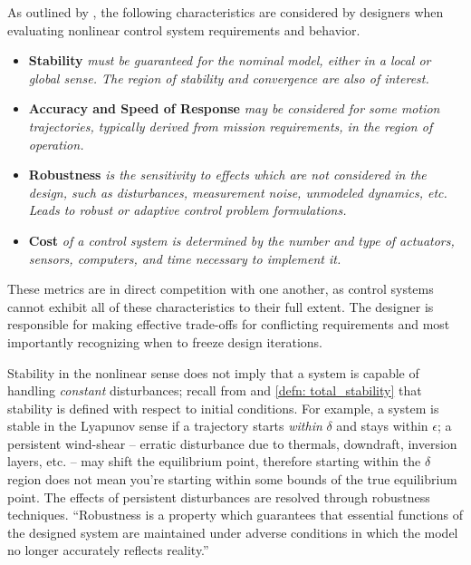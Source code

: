 \documentclass[12pt]{ucthesis}
\begin{document}
As outlined by \citet{Slotine1991}, the following characteristics are considered by designers when evaluating nonlinear control system requirements and behavior.
\begin{itemize}[labelindent=\parindent,leftmargin=\parindent,noitemsep,nosep]
	\item{\textbf{Stability} \textit{must be guaranteed for the nominal model, either in a local or global sense. The region of stability and convergence are also of interest.}
	}
	\item{\textbf{Accuracy and Speed of Response} \textit{may be considered for some motion trajectories, typically derived from mission requirements, in the region of operation.}
	}
	\item{\textbf{Robustness} \textit{is the sensitivity to effects which are not considered in the design, such as disturbances, measurement noise, unmodeled dynamics, etc. Leads to robust or adaptive control problem formulations.}
	}
	\item{\textbf{Cost} \textit{of a control system is determined by the number and type of actuators, sensors, computers, and time necessary to implement it.}
	}
\end{itemize}

These metrics are in direct competition with one another, as control systems cannot exhibit all of these characteristics to their full extent. The designer is responsible for making effective trade-offs for conflicting requirements and most importantly recognizing when to freeze design iterations.

Stability in the nonlinear sense does not imply that a system is capable of handling \textit{constant} disturbances; recall from  and \ref{defn: total_stability} that stability is defined with respect to initial conditions. For example, a system is stable in the Lyapunov sense if a trajectory starts \textit{within} $\delta$ and stays within $\epsilon$; a persistent wind-shear -- erratic disturbance due to thermals, downdraft, inversion layers, etc. -- may shift the equilibrium point, therefore starting within the $\delta$ region does not mean you're starting within some bounds of the true equilibrium point. The effects of persistent disturbances are resolved through robustness techniques. ``Robustness is a property which guarantees that essential functions of the designed system are maintained under adverse conditions in which the model no longer accurately reflects reality.'' \citep{Freeman1996a}
\end{document}
